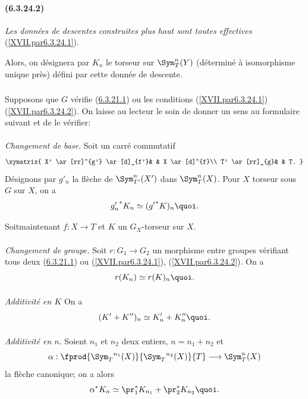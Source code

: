 \paragraph*{(6.3.24.2)}\label{XVII.par6.3.24.2}
\emph{Les données de descentes construites plus haut sont toutes
effectives} (\cf \ref{XVII.par6.3.24.1}).

Alors, on désignera par $K_{n}$ le torseur sur $\Sym^{n}_{T}(Y)$
(déterminé à isomorphisme unique près) défini par cette donnée de
descente.

\subsubsection{}
Supposons que $G$ vérifie (\hyperref[XVII.par6.3.21.1]{6.3.21.1}) ou les conditions
(\ref{XVII.par6.3.24.1}) (\ref{XVII.par6.3.24.2}). On laisse au
lecteur le soin de donner un sens au formulaire suivant et de le vérifier:

\paragraph{}
\emph{Changement de base}. Soit un carré commutatif
\[
\xymatrix{
X' \ar[rr]^{g'} \ar[d]_{f'}& & X \ar[d]^{f}\\
T' \ar[rr]_{g}& & T.
}
\]
Désignons par $g'_{n}$ la flèche de $\Sym^{n}_{T'}(X')$ dans
$\Sym^{n}_{T}(X)$. Pour $X$ torseur sous $G$ sur $X$, on a
\[
{g'_n}^{\ast} K_{n}\simeq ({g'}^{\ast}K)_{n}{\quoi}.
\]

Soit\pageoriginale maintenant $f:X\rightarrow T$ et $K$ un
$G_{X}$-torseur sur $X$.

\paragraph{}
\emph{Changement de groupe.} Soit $r:G_{1}\rightarrow G_{2}$ un
morphisme entre groupes vérifiant tous deux (\hyperref[XVII.par6.3.21.1]{6.3.21.1})
ou (\ref{XVII.par6.3.24.1}), (\ref{XVII.par6.3.24.2}). On a
\[
r(K_{n})\simeq r(K)_{n}{\quoi}.
\]

\paragraph{}
\emph{Additivité en $K$} On a
\[
(K'+K'')_{n}\simeq K'_{n}+K''_{n}{\quoi}.
\]

\paragraph{}
\emph{Additivité en $n$}. Soient $n_{1}$ et $n_{2}$ deux entiers,
$n=n_{1}+n_{2}$ et
\[
\alpha:\fprod{\Sym_{T}{}^{n_{1}}(X)}{\Sym_{T}{}^{n_{2}}(X)}{T}\longrightarrow
\Sym^{n}_{T}(X)
\]
la flèche canonique; on a alors
\[
\alpha^{\ast}K_{n}\simeq \pr^{\ast}_{1}
K_{n_{1}}+\pr^{\ast}_{2}K_{n_{2}}{\quoi}.
\]

